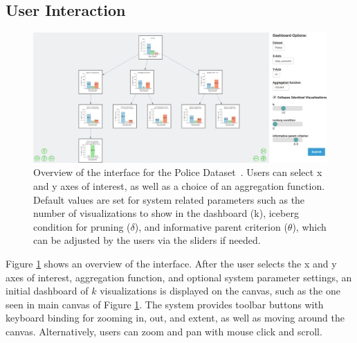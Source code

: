
\subsection{User Interaction\label{sec:interaction}}
\begin{figure}[ht!]
\centering
\includegraphics[width=\linewidth]{figures/overview.jpeg}
\caption{Overview of the \system interface for the Police Dataset~\cite{ctrp3}. Users can select x and y axes of interest, as well as a choice of an aggregation function. Default values are set for system related parameters such as the number of visualizations to show in the dashboard (k), iceberg condition for pruning ($\delta$), and informative parent criterion ($\theta$), which can be adjusted by the users via the sliders if needed.}
\label{fig:overview}
\end{figure}
\par Figure \ref{fig:overview} shows an overview of the \system interface. After the user selects the x and y axes of interest, aggregation function, and optional system parameter settings, an initial dashboard of $k$ visualizations is displayed on the canvas, such as the one seen in main canvas of Figure \ref{fig:overview}.  The system provides toolbar buttons with keyboard binding for zooming in, out, and extent, as well as moving around the canvas. Alternatively, users can zoom and pan with mouse click and scroll.


